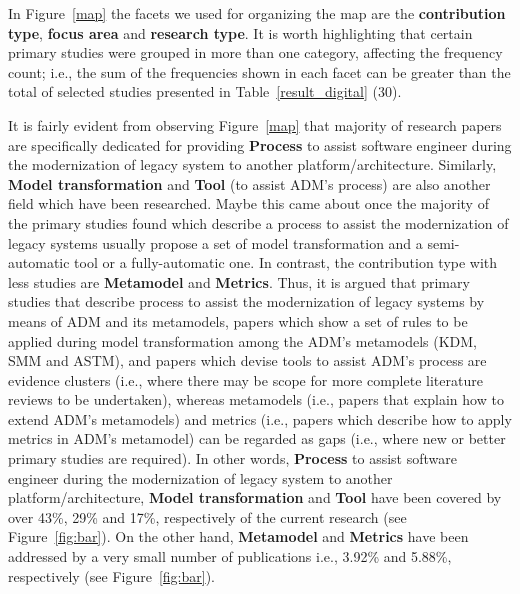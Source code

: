 In Figure~\ref{map} the facets we used for organizing the map are the \textbf{contribution type}, \textbf{focus area} and \textbf{research type}. It is worth highlighting that certain primary studies were grouped in more than one category, affecting the frequency count; i.e., the sum of the frequencies shown in each facet can be greater than the total of selected studies presented in Table~\ref{result_digital} (30).

 It is fairly evident from observing Figure~\ref{map} that majority of research papers are specifically dedicated for providing \textbf{Process} to assist software engineer during the modernization of legacy system to another platform/architecture. Similarly, \textbf{Model transformation} and \textbf{Tool} (to assist ADM's process) are also another field which have been researched. Maybe this came about once the majority of the primary studies found which describe a process to assist the modernization of legacy systems usually propose a set of model transformation and a semi-automatic tool or a fully-automatic one. In contrast, the contribution type with less studies are \textbf{Metamodel} and \textbf{Metrics}. Thus, it is argued that primary studies that describe process to assist the modernization of legacy systems by means of ADM and its metamodels, papers which show a set of rules to be applied during model transformation among the ADM's metamodels (KDM, SMM and ASTM), and papers which devise tools to assist ADM's process are evidence clusters (i.e., where there may be scope for more complete literature reviews to be undertaken), whereas metamodels (i.e., papers that explain how to extend ADM's metamodels) and metrics (i.e., papers which describe how to apply metrics in ADM's metamodel) can be regarded as gaps (i.e., where new or better primary studies are required). In other words, \textbf{Process} to assist software engineer during the modernization of legacy system to another platform/architecture, \textbf{Model transformation} and \textbf{Tool} have been covered by over 43\%, 29\% and 17\%, respectively of the current research (see Figure~\ref{fig:bar}). On the other hand, \textbf{Metamodel} and \textbf{Metrics} have been addressed by a very small number of publications i.e., 3.92\% and 5.88\%, respectively (see Figure~\ref{fig:bar}).   %

% 
 
